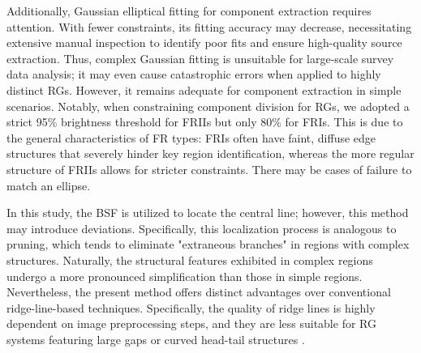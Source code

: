 \documentclass{aa}
\begin{document}

Additionally, Gaussian elliptical fitting for component extraction requires attention. With fewer constraints, its fitting accuracy may decrease, necessitating extensive manual inspection to identify poor fits and ensure high-quality source extraction. Thus, complex Gaussian fitting is unsuitable for large-scale survey data analysis; it may even cause catastrophic errors when applied to highly distinct RGs. However, it remains adequate for component extraction in simple scenarios. Notably, when constraining component division for RGs, we adopted a strict 95\% brightness threshold for FRIIs but only 80\% for FRIs. This is due to the general characteristics of FR types: FRIs often have faint, diffuse edge structures that severely hinder key region identification, whereas the more regular structure of FRIIs allows for stricter constraints. There may be cases of failure to match an ellipse.

In this study, the BSF is utilized to locate the central line; however, this method may introduce deviations. Specifically, this localization process is analogous to pruning, which tends to eliminate "extraneous branches" in regions with complex structures. Naturally, the structural features exhibited in complex regions undergo a more pronounced simplification than those in simple regions. Nevertheless, the present method offers distinct advantages over conventional ridge-line-based techniques. Specifically, the quality of ridge lines is highly dependent on image preprocessing steps, and they are less suitable for RG systems featuring large gaps or curved head-tail structures \citep[e.g.,][]{barkus_application_2021,clews_radio-loud_2025}.
\end{document}
